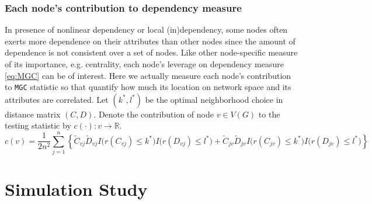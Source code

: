\documentclass[12pt]{article}
\theoremstyle{definition}
\begin{document}
\subsubsection{Each node's contribution to dependency measure}

In presence of nonlinear dependency or local (in)dependency, some nodes often exerts more dependence on their attributes than other nodes since the amount of dependence is not consistent over a set of nodes. Like other node-specific measure of its importance, e.g. centrality, each node's leverage on dependency measure \ref{eq:MGC} can be of interest. Here we actually measure each node's contribution to \texttt{MGC} statistic so that quantify how much its location on network space and its attributes are correlated.
Let $(k^{*}, l^{*})$ be the optimal neighborhood choice in distance matrix $(C, D)$.  Denote the contribution of node $v \in V(G)$ to the testing statistic by  $c(\cdot) : v \rightarrow \mathbb{R}$. 
\begin{equation}
\label{contribution}
c(v) = \frac{1}{2 n^2} \sum\limits_{j=1}^{n} \left\{     \tilde{C}_{v j} \tilde{D}_{v j} I \big(  r (C_{v j}) \leq k^{*}  \big) I \big( r (D_{ v j }) \leq l^{*} \big) + \tilde{C}_{j v} \tilde{D}_{j v} I \big(  r (C_{j v}) \leq k^{*}  \big) I \big( r (D_{j v}) \leq l^{*} \big) \right\} 
\end{equation}

\section{Simulation Study}
\label{sec:sim}
	
\end{document}

